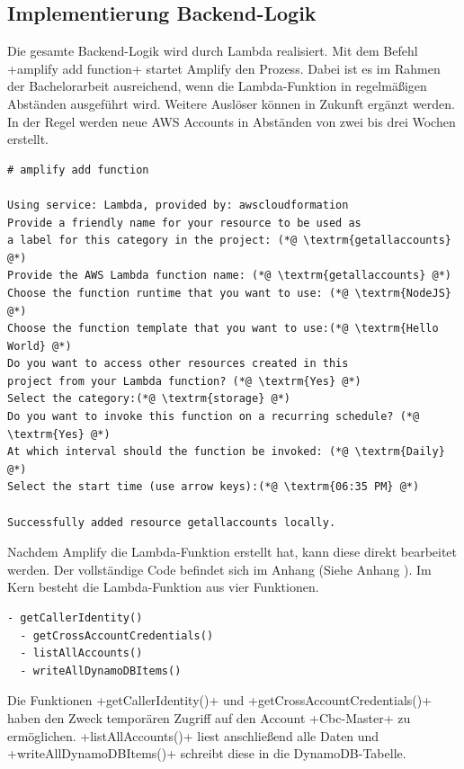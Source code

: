 \clearpage
\subsection{Implementierung Backend-Logik}
\label{ImpLambda}
Die gesamte Backend-Logik wird durch Lambda realisiert.
Mit dem Befehl \spverb+amplify add function+ startet Amplify den Prozess.
Dabei ist es im Rahmen der Bachelorarbeit ausreichend, wenn die Lambda-Funktion in regelmäßigen Abständen ausgeführt wird.
Weitere Auslöser können in Zukunft ergänzt werden.
In der Regel werden neue AWS Accounts in Abständen von zwei bis drei Wochen erstellt.
\\
\begin{lstlisting}[basicstyle=\ttfamily\small, breaklines=true , frame = single, backgroundcolor=\color{flashwhite} ]
# amplify add function

Using service: Lambda, provided by: awscloudformation
Provide a friendly name for your resource to be used as
a label for this category in the project: (*@ \textrm{getallaccounts} @*)
Provide the AWS Lambda function name: (*@ \textrm{getallaccounts} @*)
Choose the function runtime that you want to use: (*@ \textrm{NodeJS} @*)
Choose the function template that you want to use:(*@ \textrm{Hello World} @*)
Do you want to access other resources created in this
project from your Lambda function? (*@ \textrm{Yes} @*)
Select the category:(*@ \textrm{storage} @*)
Do you want to invoke this function on a recurring schedule? (*@ \textrm{Yes} @*)
At which interval should the function be invoked: (*@ \textrm{Daily} @*)
Select the start time (use arrow keys):(*@ \textrm{06:35 PM} @*)

Successfully added resource getallaccounts locally.
\end{lstlisting}

Nachdem Amplify die Lambda-Funktion erstellt hat, kann diese direkt bearbeitet werden.
Der vollständige Code befindet sich im Anhang (Siehe Anhang \textit{}).
Im Kern besteht die Lambda-Funktion aus vier Funktionen.

\begin{lstlisting}[basicstyle=\ttfamily\small, breaklines=true]
  - getCallerIdentity()
  - getCrossAccountCredentials()
  - listAllAccounts()
  - writeAllDynamoDBItems()
\end{lstlisting}

Die Funktionen \spverb+getCallerIdentity()+ und \spverb+getCrossAccountCredentials()+ haben den Zweck temporären Zugriff auf den Account \spverb+Cbc-Master+ zu ermöglichen. \cite[Letzter Absatz]{Stackoverflow}
\spverb+listAllAccounts()+ liest anschließend alle Daten und \spverb+writeAllDynamoDBItems()+ schreibt diese in die DynamoDB-Tabelle.

